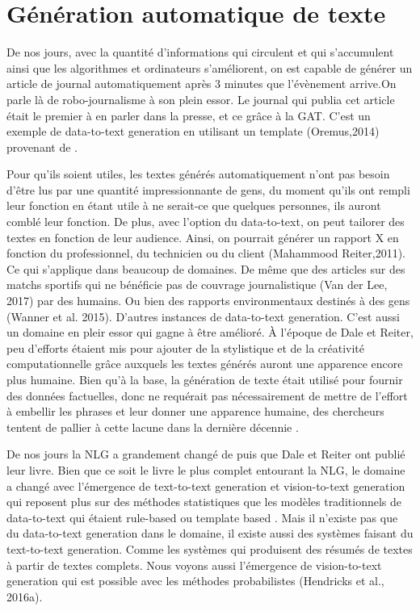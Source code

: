 \chapter{Génération automatique de texte}
De nos jours, avec la quantité d'informations qui circulent et qui s'accumulent ainsi que les algorithmes et ordinateurs s'améliorent, on est capable de générer un article de journal automatiquement après 3 minutes que l'évènement arrive.On parle là de robo-journalisme à son plein essor. Le journal qui publia cet article était le premier à en parler dans la presse, et ce grâce à la GAT. C'est un exemple de data-to-text generation en utilisant un template (Oremus,2014) provenant de \citep{GattSurveyStateArt2017}.

Pour qu'ils soient utiles, les textes générés automatiquement n'ont pas besoin d'être lus par une quantité impressionnante de gens, du moment qu'ils ont rempli leur fonction en étant utile à ne serait-ce que quelques personnes, ils auront comblé leur fonction. De plus, avec l'option du data-to-text, on peut tailorer des textes en fonction de leur audience. Ainsi, on pourrait générer un rapport X en fonction du professionnel, du technicien ou du client (Mahammood Reiter,2011). Ce qui s'applique dans beaucoup de domaines. De même que des articles sur des matchs sportifs qui ne bénéficie pas de couvrage journalistique (Van der Lee, 2017) par des humains. Ou bien des rapports environmentaux destinés à des gens (Wanner et al. 2015). D'autres instances de data-to-text generation. C'est aussi un domaine en pleir essor qui gagne à être amélioré. À l'époque de Dale et Reiter, peu d'efforts étaient mis pour ajouter de la stylistique et de la créativité computationnelle grâce auxquels les textes générés auront une apparence encore plus humaine. Bien qu'à la base, la génération de texte était utilisé pour fournir des données factuelles, donc ne requérait pas nécessairement de mettre de l'effort à embellir les phrases et leur donner une apparence humaine, des chercheurs tentent de pallier à cette lacune dans la dernière décennie \citep{GattSurveyStateArt2017}.

De nos jours la NLG a grandement changé de puis que Dale et Reiter ont publié leur livre. Bien que ce soit le livre le plus complet entourant la NLG, le domaine a changé avec l'émergence de text-to-text generation et vision-to-text generation qui reposent plus sur des méthodes statistiques que les modèles traditionnels de data-to-text qui étaient rule-based ou template based \citep{GattSurveyStateArt2017}. Mais il n'existe pas que du data-to-text generation dans le domaine, il existe aussi des systèmes faisant du text-to-text generation. Comme les systèmes qui produisent des résumés de textes à partir de textes complets. Nous voyons aussi l'émergence de vision-to-text generation qui est possible avec les méthodes probabilistes (Hendricks et al., 2016a).

